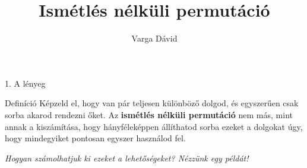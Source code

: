 \documentclass{beamer}
\title{Ismétlés nélküli permutáció}
\author{Varga Dávid}
\institute{Matematika}
\date{}
\begin{document}
\begin{frame}
    \titlepage
\end{frame}

\begin{frame}{1. A lényeg}
    \begin{block}{Definíció}
        Képzeld el, hogy van pár teljesen különböző dolgod, és egyszerűen csak sorba akarod rendezni őket. Az \textbf{ismétlés nélküli permutáció} nem más, mint annak a kiszámítása, hogy hányféleképpen állíthatod sorba ezeket a dolgokat úgy, hogy mindegyiket pontosan egyszer használod fel.
    \end{block}

    \vspace{0.5cm}
    \begin{center}
        \emph{Hogyan számolhatjuk ki ezeket a lehetőségeket? Nézzünk egy példát!}
    \end{center}
\end{frame}
\end{document}
